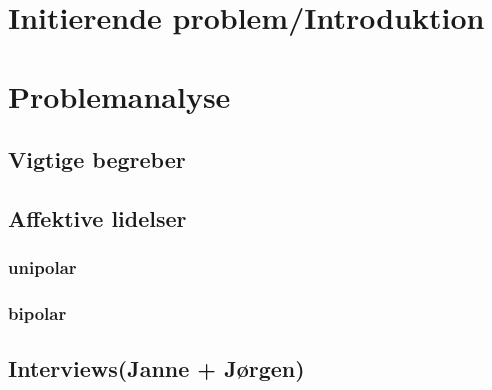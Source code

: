 %
%
%
%
% 


\pagestyle{empty} %



\cleardoublepage
{}
\pagestyle{fancy} %
\tableofcontents
\listoftodos

\cleardoublepage
\chapter{Initierende problem/Introduktion}
\chapter{Problemanalyse}
\section{Vigtige begreber}
\section{Affektive lidelser}
\subsection{unipolar}
\subsection{bipolar}
\section{Interviews(Janne + Jørgen)}

